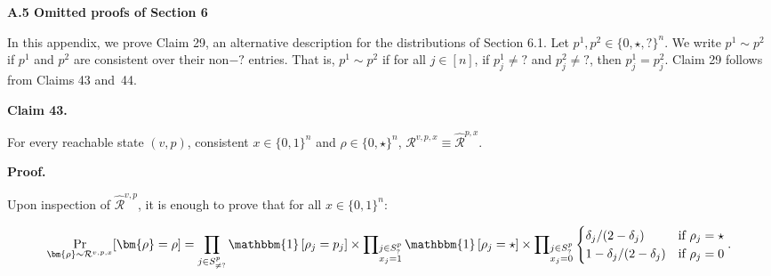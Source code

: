 \documentclass[10pt,a4paper]{article}
\begin{document}
\par\medskip\noindent\textbf{
A.5 Omitted proofs of Section 6
}\par




In this appendix, we prove Claim 29, an alternative description for the distributions of Section 6.1. Let $p^{1},p^{2}\in\{0,\star,\mathord{?}\}^{n}$. We write $p^{1}\sim p^{2}$ if $p^{1}$ and $p^{2}$ are consistent over their non$-\mathord{?}$ entries. That is, $p^{1}\sim p^{2}$ if for all $j\in[n]$, if $p^{1}_{j}\neq\mathord{?}$ and $p^{2}_{j}\neq\mathord{?}$, then $p^{1}_{j}=p^{2}_{j}$. Claim 29 follows from Claims 43 and 44.\par





\par\medskip\noindent\textbf{
Claim 43. 
}\par



For every reachable state $(v,p)$, consistent $x\in\{0,1\}^{n}$ and $\rho\in\{0,\star\}^{n}$, $\mathcal{R}^{v,p,x}\equiv\widehat{\mathcal{R}}^{p,x}$.\par






\par\medskip\noindent\textbf{
\textbf{Proof}.}\par




Upon inspection of $\widehat{\mathcal{R}}^{v,p}$, it is enough to prove that for all $x\in\{0,1\}^{n}$:\par


\[\begin{gathered}
\Pr_{\bm{\rho}\sim\mathcal{R}^{v,p,x}}[\bm{\rho}=\rho]=\prod_{j\in S^{p}_{\neq\mathord{?}}}\mathbbm{1}\left[\rho_{j}=p_{j}\right]\times\prod\nolimits_{\begin{subarray}{c}j\in S^{p}_{\mathord{?}}\\
x_{j}=1\end{subarray}}\mathbbm{1}\left[\rho_{j}=\star\right]\times\prod\nolimits_{\begin{subarray}{c}j\in S^{p}_{\mathord{?}}\\
x_{j}=0\end{subarray}}\begin{cases}\delta_{j}/(2-\delta_{j})&\textup{if $\rho_{j}=\star$}\\
1-\delta_{j}/(2-\delta_{j})&\textup{if $\rho_{j}=0$}\end{cases}.
\end{gathered}\]
\end{document}
